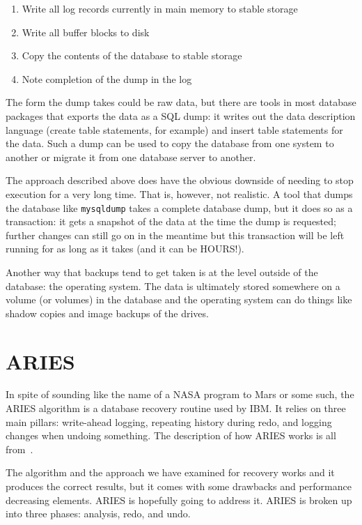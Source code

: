 \begin{enumerate}
	\item Write all log records currently in main memory to stable storage
	\item Write all buffer blocks to disk
	\item Copy the contents of the database to stable storage
	\item Note completion of the dump in the log
\end{enumerate}

The form the dump takes could be raw data, but there are tools in most database packages that exports the data as a SQL dump: it writes out the data description language (create table statements, for example) and insert table statements for the data. Such a dump can be used to copy the database from one system to another or migrate it from one database server to another.

The approach described above does have the obvious downside of needing to stop execution for a very long time. That is, however, not realistic. A tool that dumps the database like \texttt{mysqldump} takes a complete database dump, but it does so as a transaction: it gets a snapshot of the data at the time the dump is requested; further changes can still go on in the meantime but this transaction will be left running for as long as it takes (and it can be HOURS!).

Another way that backups tend to get taken is at the level outside of the database: the operating system. The data is ultimately stored somewhere on a volume (or volumes) in the database and the operating system can do things like shadow copies and image backups of the drives. 

\section*{ARIES}
In spite of sounding like the name of a NASA program to Mars or some such, the ARIES algorithm is a database recovery routine used by IBM. It relies on three main pillars: write-ahead logging, repeating history during redo, and logging changes when undoing something. The description of how ARIES works is all from~\cite{fds}.

The algorithm and the approach we have examined for recovery works and it produces the correct results, but it comes with some drawbacks and performance decreasing elements. ARIES is hopefully going to address it. ARIES is broken up into three phases: analysis, redo, and undo.


